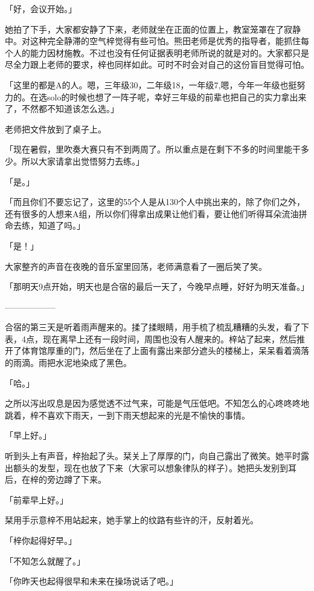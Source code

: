 \documentclass[UTF8]{ctexart}
\begin{document}
    「好，会议开始。」

    她拍了下手，大家都安静了下来，老师就坐在正面的位置上，教室笼罩在了寂静中。对这种完全静滞的空气梓觉得有些可怕。熊田老师是优秀的指导者，能抓住每个人的能力因材施教。不过也没有任何证据表明老师所说的就是对的。大家都只是尽全力跟上老师的要求，梓也同样如此。可时不时会对自己的这份盲目觉得可怕。

    「这里的都是A的人。嗯，三年级30，二年级18，一年级7,嗯，今年一年级也挺努力的。在选solo的时候也想了一阵子呢，幸好三年级的前辈也把自己的实力拿出来了，不然都不知道该怎么选。」

    老师把文件放到了桌子上。

    「现在暑假，里吹奏大赛只有不到两周了。所以重点是在剩下不多的时间里能干多少。所以大家请拿出觉悟努力去练。」

    「是。」

    「而且你们不要忘记了，这里的55个人是从130个人中挑出来的，除了你们之外，还有很多的人想来A组，所以你们得拿出成果让他们看，要让他们听得耳朵流油拼命去练，知道了吗。」

    「是！」

    大家整齐的声音在夜晚的音乐室里回荡，老师满意看了一圈后笑了笑。

    「那明天9点开始，明天也是合宿的最后一天了，今晚早点睡，好好为明天准备。」

    ——————

    合宿的第三天是听着雨声醒来的。揉了揉眼睛，用手梳了梳乱糟糟的头发，看了下表，4点，现在离早上还有一段时间，周围也没有人醒来的。梓站了起来，然后推开了体育馆厚重的门，然后坐在了上面有露出来部分遮头的楼梯上，呆呆看着滴落的雨滴。雨把水泥地染成了黑色。

    「哈。」

    之所以泻出叹息是因为感觉透不过气来，可能是气压低吧。不知怎么的心咚咚咚地跳着，梓不喜欢下雨天，一到下雨天想起来的光是不愉快的事情。

    「早上好。」

    听到头上有声音，梓抬起了头。栞关上了厚厚的门，向自己露出了微笑。她平时露出额头的发型，现在也放了下来（大家可以想象律队的样子）。她把头发别到耳后，在梓的旁边蹲了下来。

    「前辈早上好。」

    栞用手示意梓不用站起来，她手掌上的纹路有些许的汗，反射着光。

    「梓你起得好早。」

    「不知怎么就醒了。」

    「你昨天也起得很早和未来在操场说话了吧。」
\end{document}
